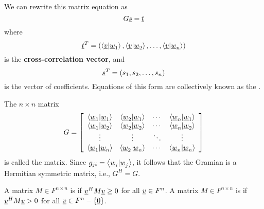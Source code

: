 We can rewrite this matrix equation as
\begin{equation*}
G \underline{s} = \underline{t}
\end{equation*}
where
\begin{equation*}
\underline{t}^T = 
\left(
\left\langle \underline{v} | \underline{w}_1 \right\rangle,
\left\langle \underline{v} | \underline{w}_2 \right\rangle, \ldots,
\left\langle \underline{v} | \underline{w}_n \right\rangle \right)
\end{equation*}
is the \textbf{cross-correlation vector}, and
\begin{equation*}
\underline{s}^T = 
\left( s_1, s_2, \ldots, s_n \right)
\end{equation*}
is the vector of coefficients.
Equations of this form are collectively known as the .

\begin{definition}
The $n \times n$ matrix
\begin{equation} \label{equation:GramianMatrix}
G = \left[ \begin{array}{cccc}
\left\langle \underline{w}_1 | \underline{w}_1 \right\rangle
& \left\langle \underline{w}_2 | \underline{w}_1 \right\rangle & \cdots
& \left\langle \underline{w}_n | \underline{w}_1 \right\rangle \\
\left\langle \underline{w}_1 | \underline{w}_2 \right\rangle
& \left\langle \underline{w}_2 | \underline{w}_2 \right\rangle & \cdots
& \left\langle \underline{w}_n | \underline{w}_2 \right\rangle \\
\vdots & \vdots & \ddots & \vdots \\
\left\langle \underline{w}_1 | \underline{w}_n \right\rangle
& \left\langle \underline{w}_2 | \underline{w}_n \right\rangle & \cdots
& \left\langle \underline{w}_n | \underline{w}_n \right\rangle
\end{array} \right]
\end{equation}
is called the  matrix.
Since $g_{ji} = \left\langle \underline{w}_i | \underline{w}_j \right\rangle$, it follows that the Gramian is a Hermitian symmetric matrix, i.e., $G^H = G$.
\end{definition}

\begin{definition}
A matrix $M\in F^{n \times n}$ is  if $\underline{v}^H M \underline{v} \geq 0$ for all $\underline{v} \in F^n$.
A matrix $M\in F^{n \times n}$ is  if $\underline{v}^H M \underline{v} > 0$ for all $\underline{v} \in F^n - \left\{ \underline{0} \right\}$.
\end{definition}

